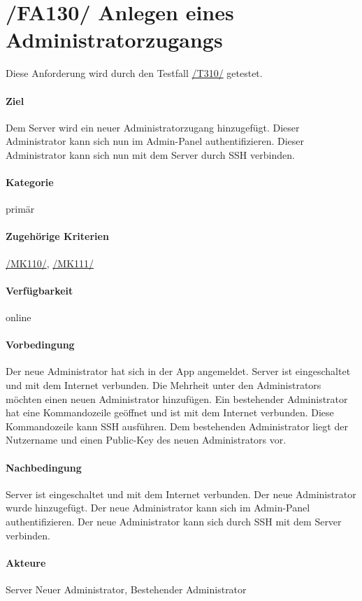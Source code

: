 \section[Anlegen eines Administratorzugangs]{/FA130/ Anlegen eines Administratorzugangs}
\label{/FA130/}
Diese Anforderung wird durch den Testfall \hyperref[/T310/]{/T310/} getestet.
\paragraph{Ziel}
Dem \Gls{Server} wird ein neuer \Gls{Administrator}zugang hinzugefügt.
Dieser Administrator kann sich nun im \Gls{Admin-Panel} authentifizieren.
Dieser Administrator kann sich nun mit dem \Gls{Server} durch \Gls{SSH} verbinden.
\paragraph{Kategorie}
primär
\paragraph{Zugehörige Kriterien}
\hyperref[/MK110/]{/MK110/}, \hyperref[/MK111/]{/MK111/}
\paragraph{Verfügbarkeit}
online
\paragraph{Vorbedingung}
Der neue \Gls{Administrator} hat sich in der App angemeldet.
\Gls{Server} ist eingeschaltet und mit dem Internet verbunden.
Die Mehrheit unter den \Glspl{Administrator} möchten einen neuen Administrator hinzufügen.
Ein bestehender \Gls{Administrator} hat eine \Gls{Kommandozeile} geöffnet und ist mit dem Internet verbunden.
Diese \Gls{Kommandozeile} kann \Gls{SSH} ausführen.
Dem bestehenden \Gls{Administrator} liegt der Nutzername und einen \Gls{Public-Key} des neuen Administrators vor.

\paragraph{Nachbedingung}
\Gls{Server} ist eingeschaltet und mit dem Internet verbunden.
Der neue \Gls{Administrator} wurde hinzugefügt.
Der neue \Gls{Administrator} kann sich im \Gls{Admin-Panel} authentifizieren.
Der neue \Gls{Administrator} kann sich durch \Gls{SSH} mit dem Server verbinden.

\paragraph{Akteure}
\Gls{Server}
Neuer \Gls{Administrator}, Bestehender \Gls{Administrator}
